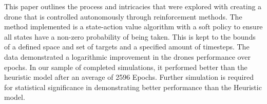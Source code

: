 This paper outlines the process and intricacies that were explored with creating a drone that is controlled autonomously through reinforcement methods. The method implemented is a state-action value algorithm with a soft policy\cite{ARXIVEXAMPLE} to ensure all states have a non-zero probability of being taken. This is kept to the bounds of a defined space and set of targets and a specified amount of timesteps. The data demonstrated a logarithmic improvement in the drones performance over epochs. In our sample of completed simulations, it performed better than the heuristic model after an average of 2596 Epochs. Further simulation is required for statistical significance in demonstrating better performance than the Heuristic model. 